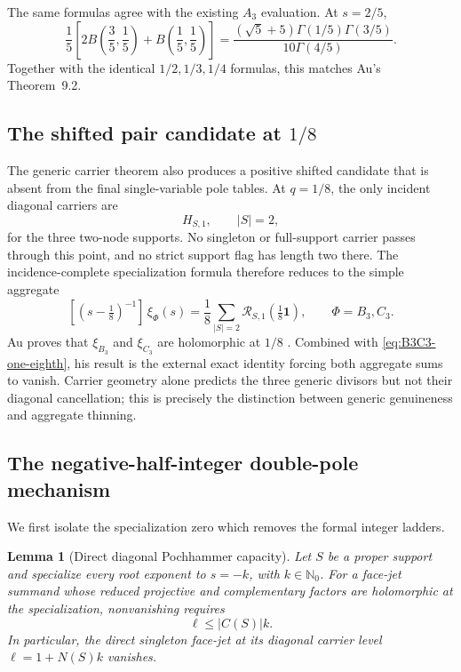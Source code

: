 \documentclass[11pt]{article}
\newtheorem{lemma}[theorem]{Lemma}
\renewcommand{\boxed}[1]{#1}
\newcommand{\Nzero}{\mathbb N_0}
\newcommand{\cR}{\mathcal R}
\newcommand{\bfone}{\mathbf 1}
\begin{document}
The same formulas agree with the existing
\(A_3\) evaluation.  At \(s=2/5\),
\begin{equation}\label{eq:A3-Au-identity}
\boxed{
 \frac15\left[2B\!\left(\frac35,\frac15\right)
 +B\!\left(\frac15,\frac15\right)\right]
 =\frac{(\sqrt5+5)\Gamma(1/5)\Gamma(3/5)}
 {10\Gamma(4/5)}.}
\end{equation}
Together with the identical \(1/2,1/3,1/4\) formulas, this matches
Au's Theorem~9.2.

\subsection{The shifted pair candidate at \texorpdfstring{\(1/8\)}{1/8}}
\label{subsec:B3C3-one-eighth}

The generic carrier theorem also produces a positive shifted candidate
that is absent from the final single-variable pole tables.  At
\(q=1/8\), the only incident diagonal carriers are
\[
 H_{S,1},\qquad |S|=2,
\]
for the three two-node supports.  No singleton or full-support carrier
passes through this point, and no strict support flag has length two
there.  The incidence-complete specialization formula therefore reduces
to the simple aggregate
\begin{equation}\label{eq:B3C3-one-eighth}
 \boxed{
 [(s-\tfrac18)^{-1}]\,\xi_\Phi(s)
 =\frac18\sum_{|S|=2}
   \cR_{S,1}\!\left(\tfrac18\bfone\right),
 \qquad \Phi=B_3,C_3.}
\end{equation}
Au proves that \(\xi_{B_3}\) and \(\xi_{C_3}\) are holomorphic at
\(1/8\) \cite[Theorems~9.4 and~9.6]{Au2025}.  Combined with
\eqref{eq:B3C3-one-eighth}, his result is the external exact identity forcing
both aggregate sums to vanish.  Carrier geometry alone predicts the three generic
divisors but not their diagonal cancellation; this is precisely the
distinction between generic genuineness and aggregate thinning.

\subsection{The negative-half-integer double-pole mechanism}

We first isolate the specialization zero which removes the formal
integer ladders.

\begin{lemma}[Direct diagonal Pochhammer capacity]
\label{lem:Pochhammer-capacity}
Let \(S\) be a proper support and specialize every root exponent to
\(s=-k\), with \(k\in\Nzero\).  For a face-jet summand whose reduced
projective and complementary factors are holomorphic at the
specialization, nonvanishing requires
\[
 \ell\le |C(S)|k.
\]
In particular, the direct singleton face-jet at its diagonal carrier
level \(\ell=1+N(S)k\) vanishes.
\end{lemma}
\end{document}

